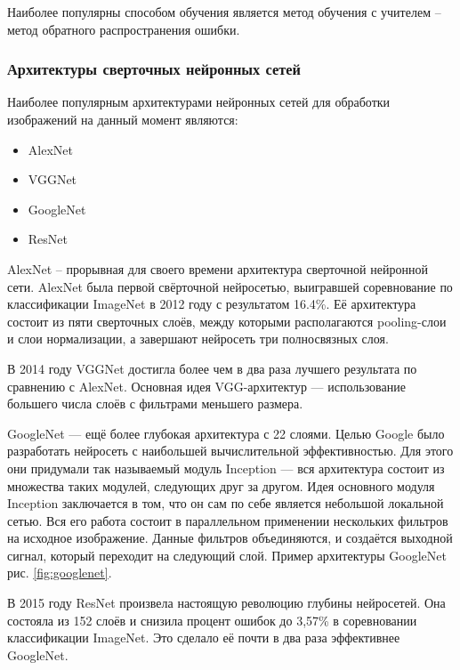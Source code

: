 \documentclass[a4paper,14pt]{article}
\begin{document}
Наиболее популярны способом обучения является метод обучения с учителем -- метод обратного распространения ошибки.

\subsubsection{Архитектуры сверточных нейронных сетей}

Наиболее популярным архитектурами нейронных сетей для обработки изображений на данный момент являются:
\begin{itemize}
	\item AlexNet
	\item VGGNet
	\item GoogleNet
	\item ResNet
\end{itemize}

AlexNet -- прорывная для своего времени архитектура сверточной нейронной сети.
AlexNet была первой свёрточной нейросетью, выигравшей соревнование по классификации ImageNet в 2012 году с результатом 16.4\%.
Её архитектура состоит из пяти сверточных слоёв, между которыми располагаются pooling-слои и слои нормализации, а завершают нейросеть три полносвязных слоя.

В 2014 году VGGNet достигла более чем в два раза лучшего результата по сравнению с AlexNet.
Основная идея VGG-архитектур — использование большего числа слоёв с фильтрами меньшего размера.

GoogleNet — ещё более глубокая архитектура с 22 слоями.
Целью Google было разработать нейросеть с наибольшей вычислительной эффективностью.
Для этого они придумали так называемый модуль Inception — вся архитектура состоит из множества таких модулей, следующих друг за другом.
Идея основного модуля Inception заключается в том, что он сам по себе является небольшой локальной сетью.
Вся его работа состоит в параллельном применении нескольких фильтров на исходное изображение.
Данные фильтров объединяются, и создаётся выходной сигнал, который переходит на следующий слой.
Пример архитектуры GoogleNet рис. \ref{fig:googlenet}.

В 2015 году ResNet произвела настоящую революцию глубины нейросетей.
Она состояла из 152 слоёв и снизила процент ошибок до 3,57\% в соревновании классификации ImageNet.
Это сделало её почти в два раза эффективнее GoogleNet.
\end{document}
